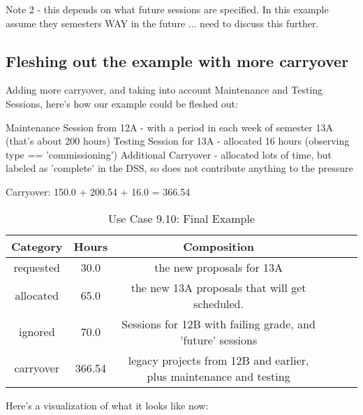 \documentclass{article}
\begin{document}
    Note 2 - this depends on what future sessions are specified. In this example assume they semesters WAY in the future ... need to discuss this further. 

\subsection{Fleshing out the example with more carryover}

Adding more carryover, and taking into account Maintenance and Testing Sessions, here's how our example could be fleshed out:

    Maintenance Session from 12A - with a period in each week of semester 13A (that's about 200 hours)
    Testing Session for 13A - allocated 16 hours (observing type == 'commissioning')
    Additional Carryover - allocated lots of time, but labeled as 'complete' in the DSS, so does not contribute anything to the pressure 

Carryover:  150.0 + 200.54 + 16.0 = 366.54

\begin{table}
{\footnotesize
\caption{Use Case 9.10: Final Example\label{tab:time}}
\begin{tabular*}{1.05\textwidth}{@{\extracolsep{\fill}}cccccc}
\hline \hline
{\bf Category} & {\bf Hours} & {\bf Composition}\\
\hline
requested & 30.0 & the new proposals for 13A\\
allocated & 65.0 & the new 13A proposals that will get scheduled.\\
ignored & 70.0 & Sessions for 12B with failing grade, and 'future' sessions\\
carryover & 366.54 & legacy projects from 12B and earlier, plus maintenance and testing\\
\hline \hline
\end{tabular*}
}
\end{table}

Here's a visualization of what it looks like now: 
\end{document}
